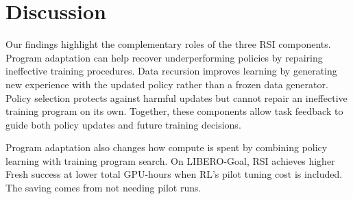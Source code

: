 
\section{Discussion}
\label{sec:discussion}

Our findings highlight the complementary roles of
the three RSI components. Program adaptation can
help recover underperforming policies by repairing
ineffective training procedures. Data recursion
improves learning by generating new experience
with the updated policy rather than a frozen
data generator. Policy selection protects against
harmful updates but cannot repair an ineffective
training program on its own. Together, these
components allow task feedback to guide both
policy updates and future training decisions.

Program adaptation also changes how compute is
spent by combining policy learning with training
program search. On LIBERO-Goal, RSI achieves
higher Fresh success at lower total GPU-hours
when RL's pilot tuning cost is included.
The saving comes from not needing pilot runs.
